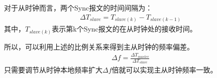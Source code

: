 对于从时钟而言，两个Sync报文的时间间隔为：
\begin{align}
	\Delta T_{slave} = T_{slave(k)} - T_{slave(k - 1)}
\end{align}
其中，$T_{slave(k)}$表示第k个Sync报文的在从时钟处的接收时间。

所以，可以利用上述的比例关系来得到主从时钟的频率偏差。
\begin{align}
	\Delta f = \frac{\Delta T_{master}}{\Delta T_{slave}}
\end{align}
只需要调节从时钟本地频率扩大$\Delta f$倍就可以实现主从时钟频率一致。




